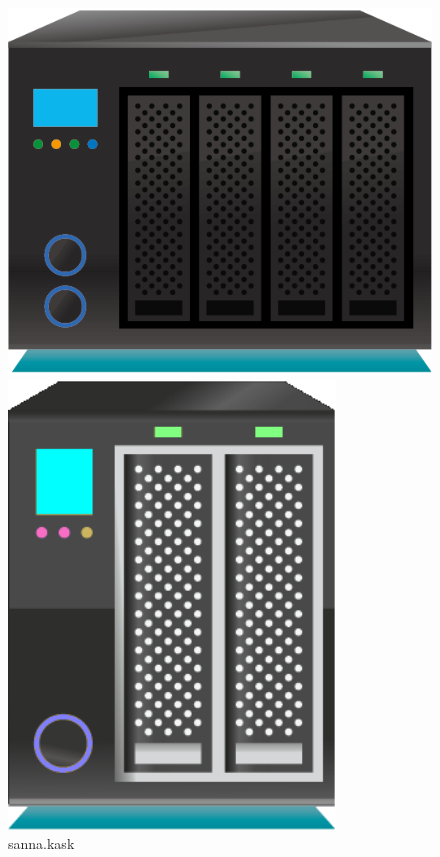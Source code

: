 \begin{figure}[hbt!]
    \centering
    \captionsetup{width=.33\linewidth}
    \begin{minipage}[t]{0.33\textwidth}
        \includegraphics[width=\textwidth]{figures/servers/sanna.kask.png}
        \caption{sanna.kask}\label{fig:sanna.kask}
    \end{minipage}
    \hspace{3cm}
    \centering
    \captionsetup{width=.21\linewidth}
    \begin{minipage}[t]{0.21\textwidth}
        \includegraphics[width=\textwidth]{figures/servers/vinnana.kask.png}

\end{minipage}
\end{figure}
